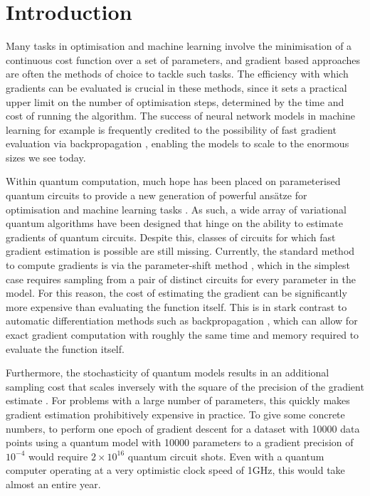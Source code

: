 \documentclass[twocolumn]{revtex4-2}
\begin{document}
\section{Introduction}
Many tasks in optimisation and machine learning involve the minimisation of a continuous cost function over a set of parameters, and gradient based approaches are often the methods of choice to tackle such tasks. The efficiency with which gradients can be evaluated is crucial in these methods, since it sets a practical upper limit on the number of optimisation steps, determined by the time and cost of running the algorithm. The success of neural network models in machine learning for example is frequently credited to the possibility of fast gradient evaluation via backpropagation \cite{backprophinton,autodiff}, enabling the models to scale to the enormous sizes we see today. 

Within quantum computation, much hope has been placed on parameterised quantum circuits to provide a new generation of powerful ans\"atze for optimisation and machine learning tasks \cite{cerezo2021variational,benedetti2019parameterized}. As such, a wide array of variational quantum algorithms have been designed that hinge on the ability to estimate gradients of quantum circuits. Despite this, classes of circuits for which fast gradient estimation is possible are still missing. Currently, the standard method to compute gradients is via the parameter-shift method \cite{PS1,PS2,PS3,PS4}, which in the simplest case requires sampling from a pair of distinct circuits for every parameter in the model. For this reason, the cost of estimating the gradient can be significantly more expensive than evaluating the function itself. This is in stark contrast to automatic differentiation methods such as backpropagation \cite{autodiff}, which can allow for exact gradient computation with roughly the same time and memory required to evaluate the function itself.

Furthermore, the stochasticity of quantum models results in an additional sampling cost that scales inversely with the square of the precision of the gradient estimate \cite{PS2}. For problems with a large number of parameters, this quickly makes gradient estimation prohibitively expensive in practice. To give some concrete numbers, to perform one epoch of gradient descent for a dataset with 10000 data points using a quantum model with 10000 parameters to a gradient precision of $10^{-4}$ would require $2\times 10^{16}$ quantum circuit shots. Even with a quantum computer operating at a very optimistic clock speed of 1GHz, this would take almost an entire year.  
\end{document}
